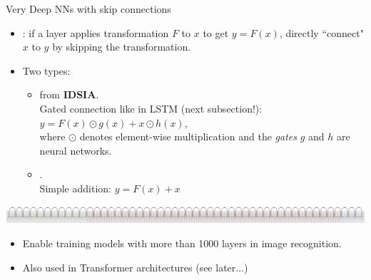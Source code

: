 \begin{frame}{Very Deep NNs with skip connections}
\begin{itemize}
\item {}:
if a layer applies transformation $F$ to $x$ to get $y = F(x)$,
directly ``connect" $x$ to $y$ by skipping the transformation.
\item Two types:
\begin{itemize}
\item  {}  from \textbf{IDSIA}.\\
Gated connection like in LSTM (next subsection!):\\
$y = F(x) \odot g(x)+ x \odot h(x) $, \\
where $\odot$ denotes element-wise multiplication and the \textit{gates} $g$ and $h$ are neural networks.\\
\item {} . \\
Simple addition:
$y = F(x) + x $
\end{itemize}
\end{itemize}
\hspace{-10mm}
{\raggedleft
    \includegraphics[height=0.09\textheight]{figures/deep_net.png} \\
}
\begin{itemize}
\item Enable training models with more than 1000 layers in image recognition.
\item Also used in Transformer architectures (see later...)
\end{itemize}
\end{frame}

